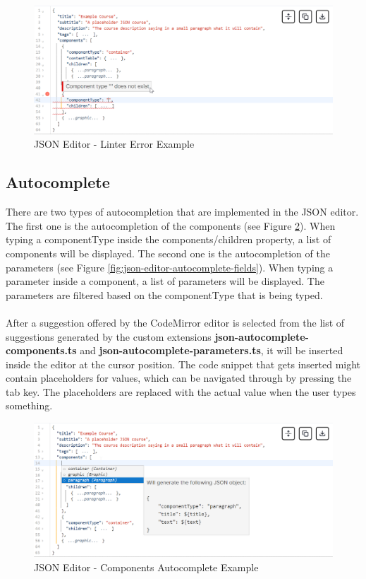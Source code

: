 \begin{figure}[h]
    \centering
    \includegraphics[scale=0.62]{images/json-editor-linter-error.png}
    \caption{JSON Editor - Linter Error Example}
    \label{fig:json-editor-linter-error}
\end{figure}

\subsection{Autocomplete}

\noindent There are two types of autocompletion that are implemented in the JSON editor. The first one is the autocompletion of the components (see Figure \ref{fig:json-editor-autocomplete-components}). When typing a componentType inside the components/children property, a list of components will be displayed. The second one is the autocompletion of the parameters (see Figure \ref{fig:json-editor-autocomplete-fields}). When typing a parameter inside a component, a list of parameters will be displayed. The parameters are filtered based on the componentType that is being typed.
\\\\
\noindent After a suggestion offered by the CodeMirror editor is selected from the list of suggestions generated by the custom extensions \textbf{json-autocomplete-components.ts} and \textbf{json-autocomplete-parameters.ts}, it will be inserted inside the editor at the cursor position. The code snippet that gets inserted might contain placeholders for values, which can be navigated through by pressing the tab key. The placeholders are replaced with the actual value when the user types something.

\begin{figure}[h]
    \centering
    \includegraphics[scale=0.65]{images/json-editor-autocomplete-components.png}
    \caption{JSON Editor - Components Autocomplete Example}
    \label{fig:json-editor-autocomplete-components}
\end{figure}

